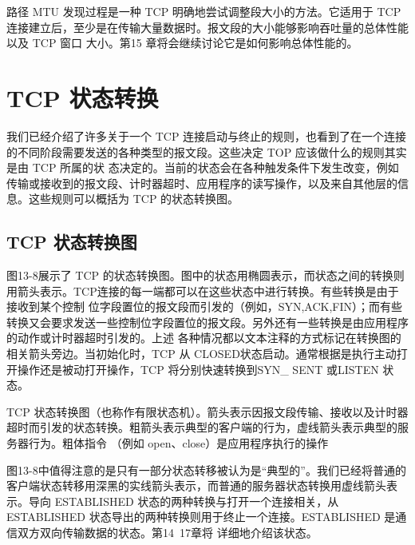 路径 MTU 发现过程是一种 TCP 明确地尝试调整段大小的方法。它适用于 TCP
连接建立后，至少是在传输大量数据时。报文段的大小能够影响吞吐量的总体性能以及 TCP 窗口
大小。第15 章将会继续讨论它是如何影响总体性能的。
\section{TCP 状态转换}
我们已经介绍了许多关于一个 TCP 连接启动与终止的规则，也看到了在一个连接的不同阶段需要发送的各种类型的报文段。这些决定 TOP
应该做什么的规则其实是由 TCP 所属的状
态决定的。当前的状态会在各种触发条件下发生改变，例如传输或接收到的报文段、计时器超时、应用程序的读写操作，以及来自其他层的信息。这些规则可以概括为
TCP 的状态转换图。

\subsection{TCP 状态转换图}
图13-8展示了 TCP
的状态转换图。图中的状态用椭圆表示，而状态之间的转换则用箭头表示。TCP连接的每一端都可以在这些状态中进行转换。有些转换是由于接收到某个控制
位字段置位的报文段而引发的（例如，SYN,ACK,FIN）；而有些转换又会要求发送一些控制位字段置位的报文段。另外还有一些转换是由应用程序的动作或计时器超时引发的。上述
各种情况都以文本注释的方式标记在转换图的相关箭头旁边。当初始化时，TCP 从
CLOSED状态启动。通常根据是执行主动打开操作还是被动打开操作，TCP 将分别快速转换到SYN\_
SENT 或LISTEN 状态。

TCP
状态转换图（也称作有限状态机）。箭头表示因报文段传输、接收以及计时器超时而引发的状态转换。粗箭头表示典型的客户端的行为，虚线箭头表示典型的服务器行为。粗体指令
（例如 open、close）是应用程序执行的操作

图13-8中值得注意的是只有一部分状态转移被认为是“典型的”。我们已经将普通的客户端状态转移用深黑的实线箭头表示，而普通的服务器状态转换用虚线箭头表示。导向
ESTABLISHED 状态的两种转换与打开一个连接相关，从ESTABLISHED
状态导出的两种转换则用于终止一个连接。ESTABLISHED 是通信双方双向传输数据的状态。第14~17章将
详细地介绍该状态。

